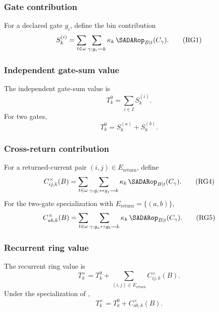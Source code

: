 \subsubsection{Gate contribution}\label{subsec:frg-gate-contribution}
For a declared gate \(g_i\), define the bin contribution
\begin{equation*}
S_k^{(i)}
=
\sum_{t\in\omega}
\sum_{\gamma:g_i\leadsto k}
\kappa_k\,
\SADARop_{B|t}(C_\gamma).
\tag{RG1}\label{eq:frg-gate-contribution}
\end{equation*}

\subsubsection{Independent gate-sum value}\label{subsec:frg-independent-gate-sum}
The independent gate-sum value is
\begin{equation*}
T_k^0=\sum_{i\in I}S_k^{(i)}.
\tag{RG2}\label{eq:frg-independent-gate-sum}
\end{equation*}
For two gates,
\begin{equation*}
T_k^0=S_k^{(a)}+S_k^{(b)}.
\tag{RG3}\label{eq:frg-independent-two-gate}
\end{equation*}

\subsubsection{Cross-return contribution}\label{subsec:frg-cross-return-contribution}
For a returned-current pair \((i,j)\in E_{\mathrm{return}}\), define
\begin{equation*}
C_{ij,k}^{\times}(B)
=
\sum_{t\in\omega}
\sum_{\gamma:g_i\leftrightarrow g_j\leadsto k}
\kappa_k\,
\SADARop_{B|t}(C_\gamma).
\tag{RG4}\label{eq:frg-cross-return-contribution}
\end{equation*}
For the two-gate specialization with
\(E_{\mathrm{return}}=\{(a,b)\}\),
\begin{equation*}
C_{ab,k}^{\times}(B)
=
\sum_{t\in\omega}
\sum_{\gamma:g_a\leftrightarrow g_b\leadsto k}
\kappa_k\,
\SADARop_{B|t}(C_\gamma).
\tag{RG5}\label{eq:frg-cross-return-two-gate}
\end{equation*}

\subsubsection{Recurrent ring value}\label{subsec:frg-recurrent-ring-value}
The recurrent ring value is
\begin{equation*}
T_k^\times
=
T_k^0+
\sum_{(i,j)\in E_{\mathrm{return}}}
C_{ij,k}^{\times}(B).
\tag{RG6}\label{eq:frg-recurrent-ring-value}
\end{equation*}
Under the specialization of ,
\begin{equation*}
T_k^\times=T_k^0+C_{ab,k}^{\times}(B).
\tag{RG7}\label{eq:frg-recurrent-two-gate}
\end{equation*}

